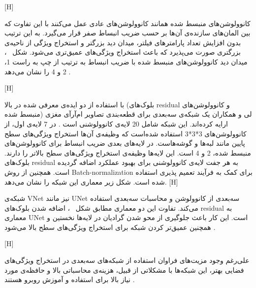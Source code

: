 [H]

کانوولوشن‌های منبسط شده همانند کانوولوشن‌های عادی عمل می‌کنند با این تفاوت که بین المان‌های سازنده‌ی آن‌ها بر حسب ضریب انبساط صفر قرار می‌گیرد. به این ترتیب بدون افزایش تعداد پارامتر‌های فیلتر، میدان دید بزرگتر و استخراج ویژگی از ناحیه‌‌ی بزرگتری صورت می‌پذیرد که باعث استخراج ویژگی‌های عمیق‌تری می‌شود. شکل ~، میدان دید کانوولوشن‌های منبسط شده با ضریب انبساط به ترتیب از چپ به راست 1، 2 و 4 را نشان می‌دهد .

[H]

با استفاده از دو ایده‌ی معرفی شده در بالا (بلوک‌های residual و کانوولوشن‌های منبسط شده) لی و همکاران یک شبکه‌ی سه‌بعدی برای قطعه‌بندی تصاویر ام‌آرآی مغزی ارایه کرده‌اند. این شبکه شامل 20 لایه‌ی کانوولوشنی است . در 7 لایه‌ی اول، از کانوولوشن‌های 3*3*3 استفاده شده‌‌است که وظیفه‌ی آن‌ها استخراج ویژگی‌های سطح پایین مانند لبه‌ها و گوشه‌هاست. در لایه‌های بعدی ضریب انبساط برای کانوولوشن‌های منبسط شده، 2 و 4 است. این لایه‌ها وظیفه‌ی استخراج ویژگی‌های سطح بالاتر را دارند. بلوک‌های residual به هر جفت لایه‌ی کانوولوشنی برای بهبود عملکرد اضافه گردیده است. همچنین از روش Batch-normalization برای کمک به فرآیند تعمیم پذیری استفاده شده است. شکل زیر معماری این شبکه را نشان می‌دهد.
[H]

شبکه‌ی VNet نیز مانند UNet سه‌بعدی از کانوولوشن و محاسبات سه‌بعدی استفاده می‌کند. تفاوت این دو معماری مطابق شکل ~، اضافه شدن بلوک‌های residual به معماری UNet است. این کار باعث جلوگیری از محو شدن گرادیان در لایه‌ها نخستین و همچنین عمیق‌تر کردن شبکه برای استخراج ویژگی‌های سطح بالا می‌شود .

[H]

علی‌رغم وجود مزیت‌های فراوان استفاده از شبکه‌های سه‌بعدی در استخراج ویژگی‌های فضایی بهتر، این شبکه‌ها با مشکلاتی از قبیل، هزینه‌ی محاسباتی بالا و حافظه‌ی مورد نیاز بالا برای استفاده و آموزش روبرو هستند . 

 
